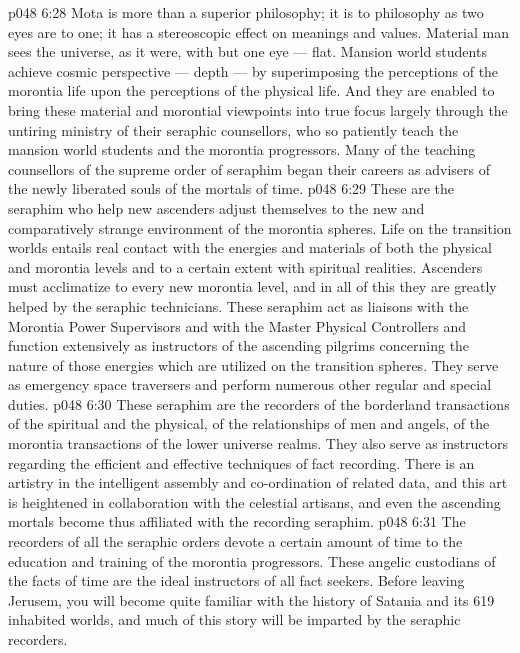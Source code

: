 \vs p048 6:28 Mota is more than a superior philosophy; it is to philosophy as two eyes are to one; it has a stereoscopic effect on meanings and values. Material man sees the universe, as it were, with but one eye --- flat. Mansion world students achieve cosmic perspective --- depth --- by superimposing the perceptions of the morontia life upon the perceptions of the physical life. And they are enabled to bring these material and morontial viewpoints into true focus largely through the untiring ministry of their seraphic counsellors, who so patiently teach the mansion world students and the morontia progressors. Many of the teaching counsellors of the supreme order of seraphim began their careers as advisers of the newly liberated souls of the mortals of time.
\vs p048 6:29 \bibnobreakspace {} These are the seraphim who help new ascenders adjust themselves to the new and comparatively strange environment of the morontia spheres. Life on the transition worlds entails real contact with the energies and materials of both the physical and morontia levels and to a certain extent with spiritual realities. Ascenders must acclimatize to every new morontia level, and in all of this they are greatly helped by the seraphic technicians. These seraphim act as liaisons with the Morontia Power Supervisors and with the Master Physical Controllers and function extensively as instructors of the ascending pilgrims concerning the nature of those energies which are utilized on the transition spheres. They serve as emergency space traversers and perform numerous other regular and special duties.
\vs p048 6:30 \bibnobreakspace {} These seraphim are the recorders of the borderland transactions of the spiritual and the physical, of the relationships of men and angels, of the morontia transactions of the lower universe realms. They also serve as instructors regarding the efficient and effective techniques of fact recording. There is an artistry in the intelligent assembly and co\hyp{}ordination of related data, and this art is heightened in collaboration with the celestial artisans, and even the ascending mortals become thus affiliated with the recording seraphim.
\vs p048 6:31 The recorders of all the seraphic orders devote a certain amount of time to the education and training of the morontia progressors. These angelic custodians of the facts of time are the ideal instructors of all fact seekers. Before leaving Jerusem, you will become quite familiar with the history of Satania and its 619 inhabited worlds, and much of this story will be imparted by the seraphic recorders.
